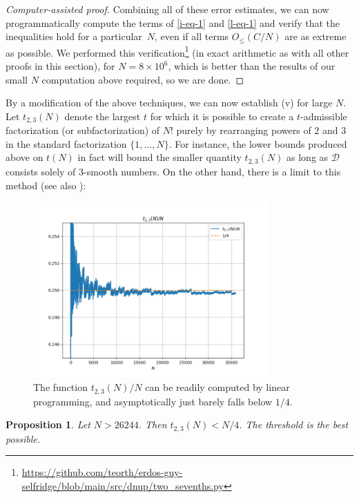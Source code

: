 \documentclass[12pt,a4paper,reqno]{amsart}
\numberwithin{equation}{section}
\theoremstyle{plain}
\newtheorem{proposition}[theorem]{Proposition}
\theoremstyle{definition}
\begin{document}
\begin{proof}[Computer-assisted proof]
Combining all of these error estimates, we can now programmatically compute the terms of \eqref{i-eq-1} and \eqref{l-eq-1} and verify that the inequalities hold for a particular~$N$, even if all terms $O_{\le}(C/N)$ are as extreme as possible.
We performed this verification\footnote{\url{https://github.com/teorth/erdos-guy-selfridge/blob/main/src/dnup/two_sevenths.py}} (in exact arithmetic as with all other proofs in this section), for $N=8\times 10^6$, which is better than the results of our small $N$ computation above required, so we are done.
\end{proof}

By a modification of the above techniques, we can now establish (v) for large $N$.  Let $t_{2,3}(N)$ denote the largest $t$ for which it is possible to create a $t$-admissible factorization (or subfactorization) of $N!$ purely by rearranging powers of $2$ and $3$ in the standard factorization $\{1,\dots,N\}$.  For instance, the lower bounds produced above on $t(N)$ in fact will bound the smaller quantity $t_{2,3}(N)$ as long as ${\mathcal D}$ consists solely of $3$-smooth numbers. On the other hand, there is a limit to this method (see also ):

\begin{figure}
  \centering
  \includegraphics[width=0.8\textwidth]{t3.png}
  \vspace{-8pt}
  \caption{The function $t_{2,3}(N)/N$ can be readily computed by linear programming, and asymptotically just barely falls below $1/4$.}\label{fig-t3}
\end{figure}

\begin{proposition}\label{onefourth}  Let $N > 26244$.  Then $t_{2,3}(N) < N/4$.  The threshold is the best possible.
\end{proposition}
\end{document}
